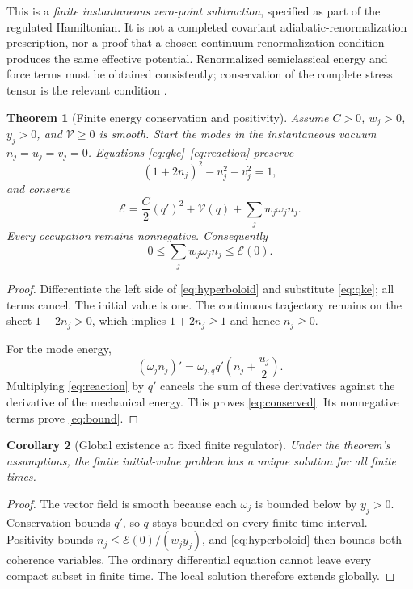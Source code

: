 \documentclass[11pt]{article}
\newtheorem{theorem}{Theorem}[section]
\newtheorem{corollary}[theorem]{Corollary}
\theoremstyle{definition}\newtheorem{definition}[theorem]{Definition}
\begin{document}
This is a \emph{finite instantaneous zero-point subtraction}, specified as part of the regulated Hamiltonian. It is not a completed covariant adiabatic-renormalization prescription, nor a proof that a chosen continuum renormalization condition produces the same effective potential. Renormalized semiclassical energy and force terms must be obtained consistently; conservation of the complete stress tensor is the relevant condition \cite{mpr,psar}.

\begin{theorem}[Finite energy conservation and positivity]
Assume $C>0$, $w_j>0$, $y_j>0$, and $\mathcal V\ge0$ is smooth. Start the modes in the instantaneous vacuum $n_j=u_j=v_j=0$. Equations \eqref{eq:qke}--\eqref{eq:reaction} preserve
\begin{equation}
 (1+2n_j)^2-u_j^2-v_j^2=1,
 \label{eq:hyperboloid}
\end{equation}
and conserve
\begin{equation}
 \boxed{\mathcal E=\frac C2(q')^2+\mathcal V(q)
 +\sum_jw_j\omega_j n_j.}
 \label{eq:conserved}
\end{equation}
Every occupation remains nonnegative. Consequently
\begin{equation}
 0\le\sum_jw_j\omega_j n_j\le\mathcal E(0).
 \label{eq:bound}
\end{equation}
\end{theorem}
\begin{proof}
Differentiate the left side of \eqref{eq:hyperboloid} and substitute \eqref{eq:qke}; all terms cancel. The initial value is one. The continuous trajectory remains on the sheet $1+2n_j>0$, which implies $1+2n_j\ge1$ and hence $n_j\ge0$.

For the mode energy,
\[
 (\omega_jn_j)'=\omega_{j,q}q'\left(n_j+\frac{u_j}{2}\right).
\]
Multiplying \eqref{eq:reaction} by $q'$ cancels the sum of these derivatives against the derivative of the mechanical energy. This proves \eqref{eq:conserved}. Its nonnegative terms prove \eqref{eq:bound}.
\end{proof}

\begin{corollary}[Global existence at fixed finite regulator]
Under the theorem's assumptions, the finite initial-value problem has a unique solution for all finite times.
\end{corollary}
\begin{proof}
The vector field is smooth because each $\omega_j$ is bounded below by $y_j>0$. Conservation bounds $q'$, so $q$ stays bounded on every finite time interval. Positivity bounds $n_j\le\mathcal E(0)/(w_jy_j)$, and \eqref{eq:hyperboloid} then bounds both coherence variables. The ordinary differential equation cannot leave every compact subset in finite time. The local solution therefore extends globally.
\end{proof}
\end{document}
